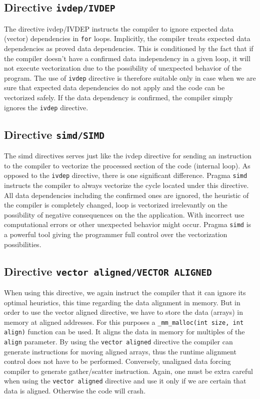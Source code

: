 \subsection{Directive \texttt{ivdep/IVDEP}}
The directive ivdep/IVDEP instructs the compiler to ignore expected data (vector) dependencies in \texttt{for} loops. Implicitly, the compiler treats expected data dependencies as proved data dependencies. This is conditioned by the fact that if the compiler doesn't have a confirmed data independency in a given loop, it will not execute vectorization due to the possibility of unexpected behavior of the program. The use of \texttt{ivdep} directive is therefore suitable only in case when we are sure that expected data dependencies do not apply and the code can be vectorized safely. If the data dependency is confirmed, the compiler simply ignores the \texttt{ivdep} directive.

\subsection{Directive \texttt{simd/SIMD}}
The simd directives serves just like the ivdep directive for sending an instruction to the compiler to vectorize the processed section of the code (internal loop). As opposed to the \texttt{ivdep} directive, there is one significant difference. Pragma \texttt{simd} instructs the compiler to always vectorize the cycle located under this directive. All data dependencies including the confirmed ones are ignored, the heuristic of the compiler is completely changed, loop is vectorized irrelevantly on the possibility of negative consequences on the the application. With incorrect use computational errors or other unexpected behavior might occur. Pragma \texttt{simd} is a powerful tool giving the programmer full control over the vectorization possibilities.

\subsection{Directive \texttt{vector aligned/VECTOR ALIGNED}}
When using this directive, we again instruct the compiler that it can ignore its optimal heuristics, this time regarding the data alignment in memory. But in order to use the vector aligned directive, we have to store the data (arrays) in memory at aligned addresses. For this purposes a \texttt{\_mm\_malloc(int size, int align)} function can be used. It aligns the data in memory for multiples of the \texttt{align} parameter. By using the \texttt{vector aligned} directive the compiler can generate instructions for moving aligned arrays, thus the runtime alignment control does not have to be performed. Conversely, unaligned data forcing compiler to generate gather/scatter instruction. Again, one must be extra careful when using the \texttt{vector aligned} directive and use it only if we are certain that data is aligned. Otherwise the code will crash.

